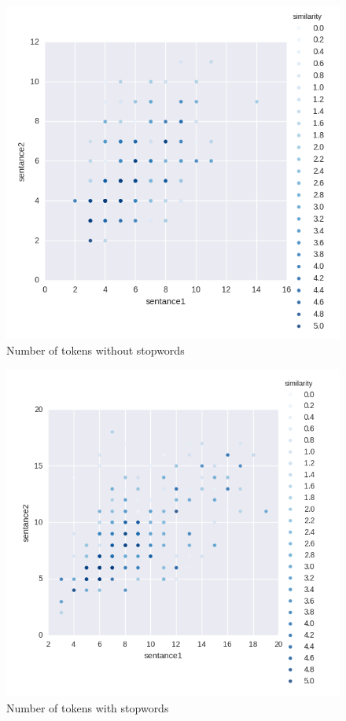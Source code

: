 \documentclass[10pt, a4paper]{article}
\begin{document}
\begin{figure}[h]
\begin{center}
\includegraphics[width=\columnwidth]{tokens_no_stop.png}
\caption{Number of tokens without stopwords}
\label{fig:lstm_2nd_layer}
\end{center}
\end{figure}

\begin{figure}[h]
\begin{center}
\includegraphics[width=\columnwidth]{tokens_with_stop.png}
\caption{Number of tokens with stopwords}
\label{fig:lstm_2nd_layer}
\end{center}
\end{figure}
\end{document}
